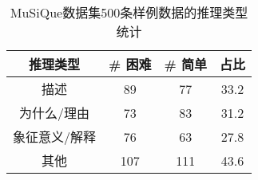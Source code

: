 \begin{table}[htbp]
    \centering
    \caption{MuSiQue数据集500条样例数据的推理类型统计}
    \label{tab:2-6}
    \begin{tabular}{c|c|c|c}
        \hline
        推理类型 & \# 困难 & \# 简单 & 占比 \\
        \hline
        描述 & 89 & 77 & 33.2  \\
        为什么/理由 & 73 & 83 & 31.2  \\
        象征意义/解释 & 76 & 63 & 27.8  \\
        其他 & 107 & 111 & 43.6  \\
        \hline
    \end{tabular}
\end{table}


